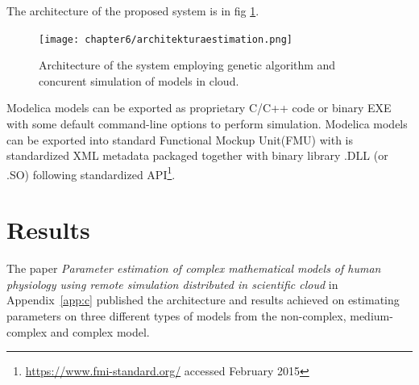 The architecture of the proposed system is in fig \ref{fig:architectureestimation}.
\begin{figure}[htb]
    \centering
    \texttt{[image: chapter6/architekturaestimation.png]}
    \caption{Architecture of the system employing genetic algorithm and concurent simulation of models in cloud.
    }
    \label{fig:architectureestimation}
\end{figure}
Modelica models can be exported as proprietary C/C++ code or binary EXE with some default command-line options to perform simulation. Modelica models can be exported into standard Functional Mockup Unit(FMU) with is standardized XML metadata packaged together with  binary library .DLL (or .SO) following standardized API\footnote{\url{https://www.fmi-standard.org/} accessed February 2015}.


\section{Results}
\label{sec:resultsestimation}

The paper \cite{Kulhanek2014Parameters} \emph{Parameter estimation of complex mathematical models of human physiology using remote simulation distributed in scientific cloud} in Appendix~\ref{app:c} published the architecture and results achieved on estimating parameters on three  different types of models from the non-complex, medium-complex and complex model.
